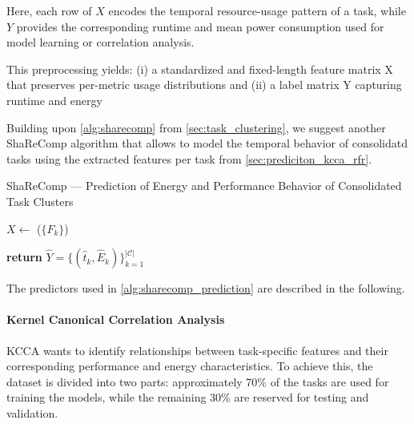 Here, each row of \( X \) encodes the temporal resource-usage pattern
of a task, while \( Y \) provides the corresponding runtime and mean
power consumption used for model learning or correlation analysis.

This preprocessing yields: (i) a standardized and fixed-length feature matrix X that preserves per-metric usage distributions and (ii) a label matrix Y capturing runtime and energy

Building upon \ref{alg:sharecomp} from \ref{sec:task_clustering}, we suggest another ShaReComp algorithm that allows to model the temporal behavior of consolidatd tasks using the extracted features per task from \ref{sec:prediciton_kcca_rfr}.

\begin{algorithm}[H]
    \caption{ShaReComp — Prediction of Energy and Performance Behavior of Consolidated Task Clusters}
    \label{alg:sharecomp_prediction}


    \BlankLine
    $X \gets$ \Build($\{F_k\}$) 

    \BlankLine
    \BlankLine
    \textbf{return } $\hat{Y} = \{ (\hat{t}_k, \hat{E}_k) \}_{k=1}^{|\mathcal{C}|}$
\end{algorithm}

The predictors used in \ref{alg:sharecomp_prediction} are described in the following.

\paragraph{Kernel Canonical Correlation Analysis}
KCCA wants to identify relationships between task-specific features and their corresponding performance and energy characteristics. To achieve this, the dataset is divided into two parts: approximately 70\% of the tasks are used for training the models, while the remaining 30\% are reserved for testing and validation.

